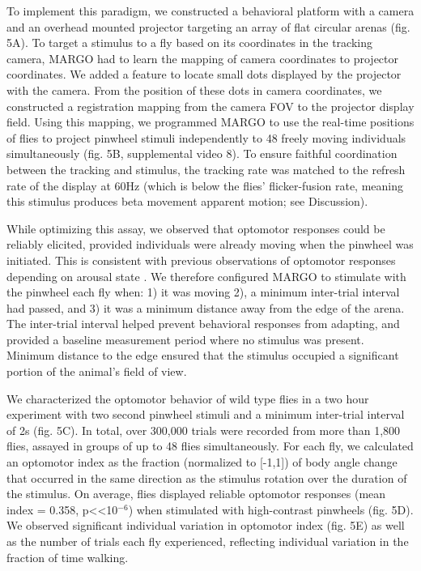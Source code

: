\documentclass[10pt]{article}
\begin{document}
\begin{multicols}{2}
To implement this paradigm, we constructed a behavioral platform with a camera and an overhead mounted projector targeting an array of flat circular arenas (fig. 5A). To target a stimulus to a fly based on its coordinates in the tracking camera, MARGO had to learn the mapping of camera coordinates to projector coordinates. We added a feature to locate small dots displayed by the projector with the camera. From the position of these dots in camera coordinates, we constructed a registration mapping from the camera FOV to the projector display field. Using this mapping, we programmed MARGO to use the real-time positions of flies to project pinwheel stimuli independently to 48 freely moving individuals simultaneously (fig. 5B, supplemental video 8). To ensure faithful coordination between the tracking and stimulus, the tracking rate was matched to the refresh rate of the display at 60Hz (which is below the flies' flicker-fusion rate, meaning this stimulus produces beta movement apparent motion\cite{haag_arenz_serbe_gabbiani_borst_2016}; see Discussion). 

While optimizing this assay, we observed that optomotor responses could be reliably elicited, provided individuals were already moving when the pinwheel was initiated. This is consistent with previous observations of optomotor responses depending on arousal state \cite{Zhu_Peripheral_2009,Kim_Fly_2016}. We therefore configured MARGO to stimulate with the pinwheel each fly when: 1) it was moving 2), a minimum inter-trial interval had passed, and 3) it was a minimum distance away from the edge of the arena. The inter-trial interval helped prevent behavioral responses from adapting, and provided a baseline measurement period where no stimulus was present. Minimum distance to the edge ensured that the stimulus occupied a significant portion of the animal's field of view. 

We characterized the optomotor behavior of wild type flies in a two hour experiment with two second pinwheel stimuli and a minimum inter-trial interval of 2s (fig. 5C). In total, over 300,000 trials were recorded from more than 1,800 flies, assayed in groups of up to 48 flies simultaneously. For each fly, we calculated an optomotor index \cite{Seelig_Two_2010} as the fraction (normalized to [-1,1]) of body angle change that occurred in the same direction as the stimulus rotation over the duration of the stimulus. On average, flies displayed reliable optomotor responses (mean index = 0.358, p<<10$^{-6}$) when stimulated with high-contrast pinwheels (fig. 5D). We observed significant individual variation in optomotor index (fig. 5E) as well as the number of trials each fly experienced, reflecting individual variation in the fraction of time walking. 


\end{multicols}
\end{document}
